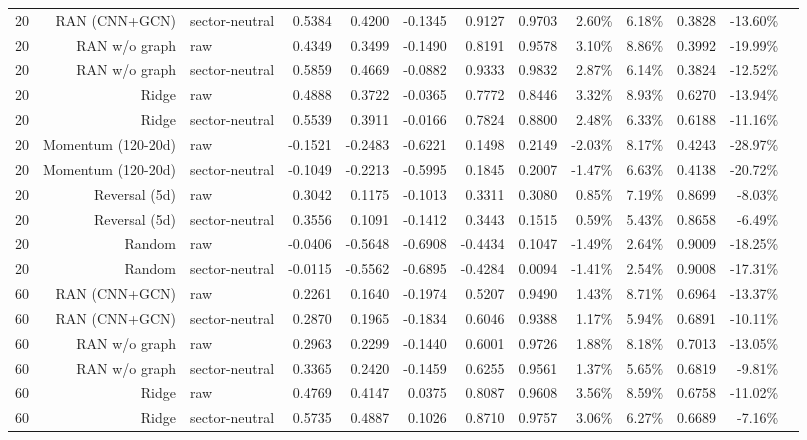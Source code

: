 \documentclass[10pt]{article}
\begin{document}
\begin{longtable}{rrlrrrrrrrrrr}
20 & RAN (CNN+GCN) & sector-neutral & 0.5384 & 0.4200 & -0.1345 & 0.9127 & 0.9703 & 2.60\% & 6.18\% & 0.3828 & -13.60\% \\
20 & RAN w/o graph & raw & 0.4349 & 0.3499 & -0.1490 & 0.8191 & 0.9578 & 3.10\% & 8.86\% & 0.3992 & -19.99\% \\
20 & RAN w/o graph & sector-neutral & 0.5859 & 0.4669 & -0.0882 & 0.9333 & 0.9832 & 2.87\% & 6.14\% & 0.3824 & -12.52\% \\
20 & Ridge & raw & 0.4888 & 0.3722 & -0.0365 & 0.7772 & 0.8446 & 3.32\% & 8.93\% & 0.6270 & -13.94\% \\
20 & Ridge & sector-neutral & 0.5539 & 0.3911 & -0.0166 & 0.7824 & 0.8800 & 2.48\% & 6.33\% & 0.6188 & -11.16\% \\
20 & Momentum (120-20d) & raw & -0.1521 & -0.2483 & -0.6221 & 0.1498 & 0.2149 & -2.03\% & 8.17\% & 0.4243 & -28.97\% \\
20 & Momentum (120-20d) & sector-neutral & -0.1049 & -0.2213 & -0.5995 & 0.1845 & 0.2007 & -1.47\% & 6.63\% & 0.4138 & -20.72\% \\
20 & Reversal (5d) & raw & 0.3042 & 0.1175 & -0.1013 & 0.3311 & 0.3080 & 0.85\% & 7.19\% & 0.8699 & -8.03\% \\
20 & Reversal (5d) & sector-neutral & 0.3556 & 0.1091 & -0.1412 & 0.3443 & 0.1515 & 0.59\% & 5.43\% & 0.8658 & -6.49\% \\
20 & Random & raw & -0.0406 & -0.5648 & -0.6908 & -0.4434 & 0.1047 & -1.49\% & 2.64\% & 0.9009 & -18.25\% \\
20 & Random & sector-neutral & -0.0115 & -0.5562 & -0.6895 & -0.4284 & 0.0094 & -1.41\% & 2.54\% & 0.9008 & -17.31\% \\
60 & RAN (CNN+GCN) & raw & 0.2261 & 0.1640 & -0.1974 & 0.5207 & 0.9490 & 1.43\% & 8.71\% & 0.6964 & -13.37\% \\
60 & RAN (CNN+GCN) & sector-neutral & 0.2870 & 0.1965 & -0.1834 & 0.6046 & 0.9388 & 1.17\% & 5.94\% & 0.6891 & -10.11\% \\
60 & RAN w/o graph & raw & 0.2963 & 0.2299 & -0.1440 & 0.6001 & 0.9726 & 1.88\% & 8.18\% & 0.7013 & -13.05\% \\
60 & RAN w/o graph & sector-neutral & 0.3365 & 0.2420 & -0.1459 & 0.6255 & 0.9561 & 1.37\% & 5.65\% & 0.6819 & -9.81\% \\
60 & Ridge & raw & 0.4769 & 0.4147 & 0.0375 & 0.8087 & 0.9608 & 3.56\% & 8.59\% & 0.6758 & -11.02\% \\
60 & Ridge & sector-neutral & 0.5735 & 0.4887 & 0.1026 & 0.8710 & 0.9757 & 3.06\% & 6.27\% & 0.6689 & -7.16\% \\

\end{longtable}
\end{document}
